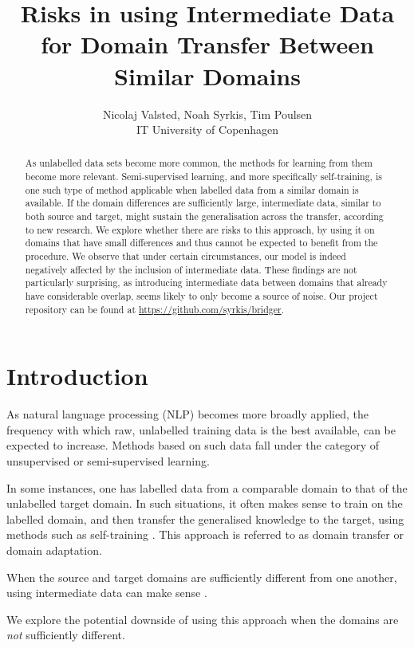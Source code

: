 \documentclass[11pt,a4paper]{article}
\title{Risks in using Intermediate Data for Domain Transfer Between Similar Domains}
\author{Nicolaj Valsted, Noah Syrkis, Tim Poulsen \\
  IT University of Copenhagen\\
  \eml{ \{nicv, nobr, timp\} @itu.dk}
}
\date{}
\begin{document}
\maketitle
\begin{abstract}

As unlabelled data sets become more common, the methods for learning from them become more relevant.
Semi-supervised learning, and more specifically self-training, is one such type of method applicable when labelled data from a similar domain is available.
If the domain differences are sufficiently large, intermediate data, similar to both source and target, might sustain the generalisation across the transfer, according to new research.
We explore whether there are risks to this approach, by using it on domains that have small differences and thus cannot be expected to benefit from the procedure.
We observe that under certain circumstances, our model is indeed negatively affected by the inclusion of intermediate data.
These findings are not particularly surprising, as introducing intermediate data between domains that already have considerable overlap, seems likely to only become a source of noise. Our project repository can be found at \url{https://github.com/syrkis/bridger}.

\end{abstract}

\section*{Introduction}
As natural language processing (NLP) becomes more broadly applied, the frequency with which raw, unlabelled training data is the best available, can be expected to increase.
Methods based on such data fall under the category of unsupervised or semi-supervised learning. 

In some instances, one has labelled data from a comparable domain to that of the unlabelled target domain. In such situations, it often makes sense to train on the labelled domain, and then transfer the generalised knowledge to the target, using methods such as self-training \cite{yarowsky1995unsupervised}. This approach is referred to as domain transfer or domain adaptation.

When the source and target domains are sufficiently different from one another, using intermediate data can make sense \cite{kumar2020understanding}. 

We explore the potential downside of using this approach when the domains are \textit{not} sufficiently different.
\end{document}
